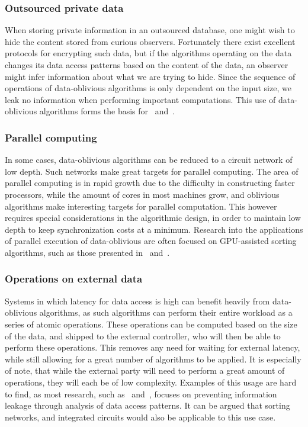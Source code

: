 \subsubsection{Outsourced private data}

When storing private information in an outsourced database, one might wish to hide the content stored from curious observers. Fortunately there exist excellent protocols for encrypting such data, but if the algorithms operating on the data changes its data access patterns based on the content of the data, an observer might infer information about what we are trying to hide. Since the sequence of operations of data-oblivious algorithms is only dependent on the input size, we leak no information when performing important computations.
This use of data-oblivious algorithms forms the basis for~ and~.


\subsubsection{Parallel computing}

In some cases, data-oblivious algorithms can be reduced to a circuit network of low depth. Such networks make great targets for parallel computing. The area of parallel computing is in rapid growth due to the difficulty in constructing faster processors, while the amount of cores in most machines grow, and oblivious algorithms make interesting targets for parallel computation. This however requires special considerations in the algorithmic design, in order to maintain low depth to keep synchronization costs at a minimum.
Research into the applications of parallel execution of data-oblivious are often focused on GPU-assisted sorting algorithms, such as those presented in~ and~.  

\subsubsection{Operations on external data}

Systems in which latency for data access is high can benefit heavily from data-oblivious algorithms, as such algorithms can perform their entire workload as a series of atomic operations. These operations can be computed based on the size of the data, and shipped to the external controller, who will then be able to perform these operations. This removes any need for waiting for external latency, while still allowing for a great number of algorithms to be applied. It is especially of note, that while the external party will need to perform a great amount of operations, they will each be of low complexity.
Examples of this usage are hard to find, as most research, such as~ and~, focuses on preventing information leakage through analysis of data access patterns. It can be argued that sorting networks, and integrated circuits would also be applicable to this use case. 
